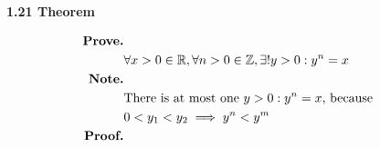 \documentclass{article}
\begin{document}
  \subsection{}


  {\bf 1.21 Theorem}

  \begin{align*}
    \text{\bf Prove.} \\
      & \forall x > 0 \in \mathbb{R}, \forall n > 0 \in \mathbb{Z}, \exists! y > 0 : y^n = x \\
    \text{\bf Note.} \\
      & \text{There is at most one $y > 0 : y^n = x$, because } \\
      & 0 < y_1 < y_2 \implies y^n < y^m \\
    \text{\bf Proof.} \\
  \end{align*}
\end{document}
